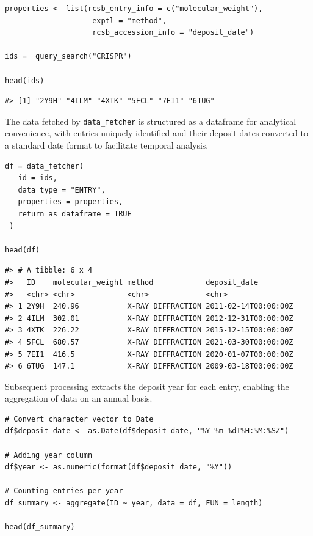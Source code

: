 \begin{verbatim}
properties <- list(rcsb_entry_info = c("molecular_weight"),
                    exptl = "method",
                    rcsb_accession_info = "deposit_date")

ids =  query_search("CRISPR")

head(ids)
\end{verbatim}

\begin{verbatim}
#> [1] "2Y9H" "4ILM" "4XTK" "5FCL" "7EI1" "6TUG"
\end{verbatim}

The data fetched by \texttt{data\_fetcher} is structured as a dataframe for analytical convenience, with entries uniquely identified and their deposit dates converted to a standard date format to facilitate temporal analysis.

\begin{verbatim}
df = data_fetcher(
   id = ids,
   data_type = "ENTRY",
   properties = properties,
   return_as_dataframe = TRUE
 )

head(df)
\end{verbatim}

\begin{verbatim}
#> # A tibble: 6 x 4
#>   ID    molecular_weight method            deposit_date        
#>   <chr> <chr>            <chr>             <chr>               
#> 1 2Y9H  240.96           X-RAY DIFFRACTION 2011-02-14T00:00:00Z
#> 2 4ILM  302.01           X-RAY DIFFRACTION 2012-12-31T00:00:00Z
#> 3 4XTK  226.22           X-RAY DIFFRACTION 2015-12-15T00:00:00Z
#> 4 5FCL  680.57           X-RAY DIFFRACTION 2021-03-30T00:00:00Z
#> 5 7EI1  416.5            X-RAY DIFFRACTION 2020-01-07T00:00:00Z
#> 6 6TUG  147.1            X-RAY DIFFRACTION 2009-03-18T00:00:00Z
\end{verbatim}

Subsequent processing extracts the deposit year for each entry, enabling the aggregation of data on an annual basis.

\begin{verbatim}
# Convert character vector to Date
df$deposit_date <- as.Date(df$deposit_date, "%Y-%m-%dT%H:%M:%SZ")

# Adding year column
df$year <- as.numeric(format(df$deposit_date, "%Y"))

# Counting entries per year
df_summary <- aggregate(ID ~ year, data = df, FUN = length)

head(df_summary)
\end{verbatim}

